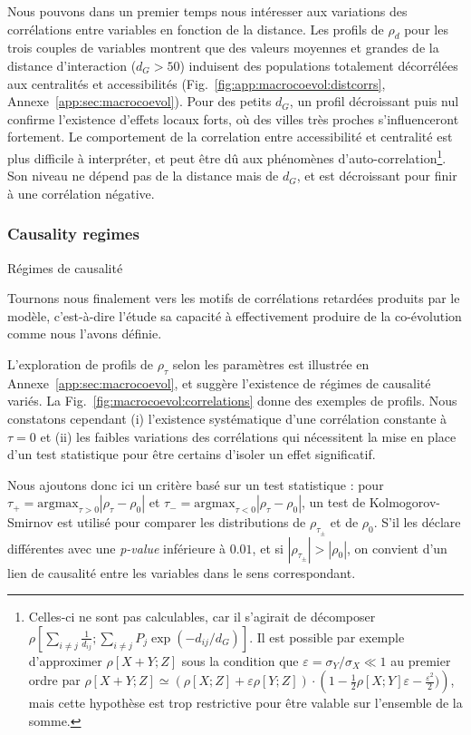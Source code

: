 Nous pouvons dans un premier temps nous intéresser aux variations des corrélations entre variables en fonction de la distance. Les profils de $\rho_d$ pour les trois couples de variables montrent que des valeurs moyennes et grandes de la distance d'interaction ($d_G > 50$) induisent des populations totalement décorrélées aux centralités et accessibilités (Fig.~\ref{fig:app:macrocoevol:distcorrs}, Annexe~\ref{app:sec:macrocoevol}). Pour des petits $d_G$, un profil décroissant puis nul confirme l'existence d'effets locaux forts, où des villes très proches s'influenceront fortement. Le comportement de la correlation entre accessibilité et centralité est plus difficile à interpréter, et peut être dû aux phénomènes d'auto-correlation\footnote{Celles-ci ne sont pas calculables, car il s'agirait de décomposer $\rho\left[\sum_{i\neq j} \frac{1}{d_{ij}}; \sum_{i\neq j} P_j \exp{\left(-d_{ij}/d_G\right)}\right]$. Il est possible par exemple d'approximer $\rho\left[X+Y;Z\right]$ sous la condition que $\varepsilon = \sigma_Y / \sigma_X \ll 1$ au premier ordre par $\rho\left[ X+Y;Z \right] \simeq \left(\rho\left[ X;Z \right]  + \varepsilon \rho\left[Y;Z\right]\right)\cdot\left(1 - \frac{1}{2}\rho\left[X;Y\right]\varepsilon - \frac{\varepsilon^2}{2})\right)$, mais cette hypothèse est trop restrictive pour être valable sur l'ensemble de la somme.}. Son niveau ne dépend pas de la distance mais de $d_G$, et est décroissant pour finir à une corrélation négative.




\subsubsection{Causality regimes}{Régimes de causalité}


Tournons nous finalement vers les motifs de corrélations retardées produits par le modèle, c'est-à-dire l'étude sa capacité à effectivement produire de la co-évolution comme nous l'avons définie.

L'exploration de profils de $\rho_{\tau}$ selon les paramètres est illustrée en Annexe~\ref{app:sec:macrocoevol}, et suggère l'existence de régimes de causalité variés. La Fig.~\ref{fig:macrocoevol:correlations} donne des exemples de profils. Nous constatons cependant (i) l'existence systématique d'une corrélation constante à $\tau = 0$ et (ii) les faibles variations des corrélations qui nécessitent la mise en place d'un test statistique pour être certains d'isoler un effet significatif.


Nous ajoutons donc ici un critère basé sur un test statistique : pour $\tau_+ = \textrm{argmax}_{\tau>0} \left|\rho_{\tau} - \rho_0\right|$ et $\tau_- = \textrm{argmax}_{\tau<0} \left|\rho_{\tau} - \rho_0\right|$, un test de Kolmogorov-Smirnov est utilisé pour comparer les distributions de $\rho_{\tau_{\pm}}$ et de $\rho_0$. S'il les déclare différentes avec une \emph{p-value} inférieure à $0.01$, et si $\left|\rho_{\tau_{\pm}}\right| > \left|\rho_0\right|$, on convient d'un lien de causalité entre les variables dans le sens correspondant.

